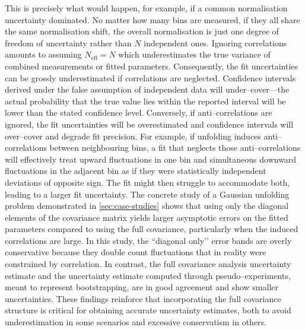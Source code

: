     This is precisely what would happen, for example, if a common normalisation uncertainty dominated.
    No matter how many bins are measured, if they all share the same normalisation shift, the overall normalisation is just one degree of freedom of uncertainty rather than $N$ independent ones.
    Ignoring correlations amounts to assuming $N_{\text{eff}} = N$ which underestimates the true variance of combined measurements or fitted parameters.
    Consequently, the fit uncertainties can be grossly underestimated if correlations are neglected.
    Confidence intervals derived under the false assumption of independent data will under--cover---the actual probability that the true value lies within the reported interval will be lower than the stated confidence level.
    Conversely, if anti--correlations are ignored, the fit uncertainties will be overestimated and confidence intervals will over--cover and degrade fit precision.
    For example, if unfolding induces anti--correlations between neighbouring bins, a fit that neglects those anti--correlations will effectively treat upward fluctuations in one bin and simultaneous downward fluctuations in the adjacent bin as if they were statistically independent deviations of opposite sign.
    The fit might then struggle to accommodate both, leading to a larger fit uncertainty.
    The concrete study of a Gaussian unfolding problem demonstrated in \cref{sec:case-studies} shows that using only the diagonal elements of the covariance matrix yields larger asymptotic errors on the fitted parameters compared to using the full covariance, particularly when the induced correlations are large.
    In this study, the ``diagonal only’’ error bands are overly conservative because they double count fluctuations that in reality were constrained by correlation.
    In contrast, the full covariance analysis uncertainty estimate and the uncertainty estimate computed through pseudo--experiments, meant to represent bootstrapping, are in good agreement and show smaller uncertainties.
    These findings reinforce that incorporating the full covariance structure is critical for obtaining accurate uncertainty estimates, both to avoid underestimation in some scenarios and excessive conservatism in others.

